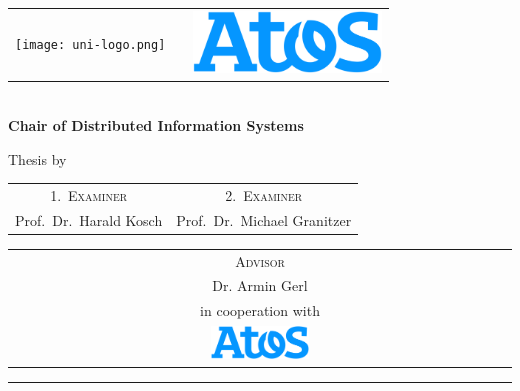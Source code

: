\begin{titlepage}
    \centering
    \begin{onehalfspace}
    	\begin{tabular}{lcr}
        	\texttt{[image: uni-logo.png]} & \hfill & \includegraphics[width=5cm]{images/atos_logo.png}\\
        \end{tabular}
    \\
        	\vspace{1.0cm}
        	\large {\bfseries Chair of Distributed Information Systems } \\

        	\vspace{2.5cm}

            \begin{doublespace}
            	\textenglish{\textsf{\Huge{\thetitle}}}
            \end{doublespace}

        	\vspace{1.5cm}

            \Large{Thesis by}\\

        	\vspace{0.5cm}

        	{\bfseries \large{\theauthor}}
        	
        	\vspace{0.5cm}

        	{\large
        		\begin{tabular}[l]{cc}
        			\textsc{1.~Examiner} & \textsc{2.~Examiner} \\
        			Prof.~Dr.~Harald Kosch & Prof.~Dr.~Michael Granitzer
        		\end{tabular}
        	}
			
			\vspace{0.5cm}


			{\large
				\begin{tabular}[l]{c}
					\textsc{Advisor} \\
					Dr. Armin Gerl \\
					in cooperation with \\
					\includegraphics[width=0.2\textwidth]{images/atos_logo.png}
				\end{tabular}
			}
        	\parbox{\linewidth}{\hrule\strut}

            \vfill

	    \thedate
    \end{onehalfspace}
\end{titlepage}
